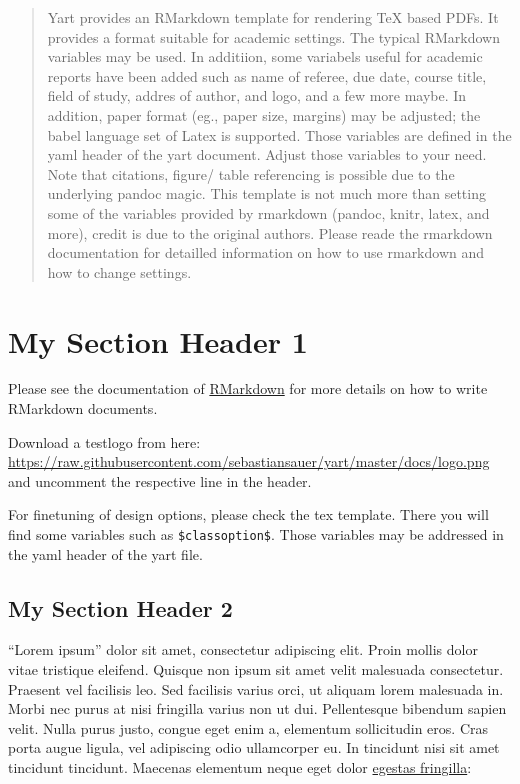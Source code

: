 \documentclass[11pt,ngerman,a4paper,oneside]{article}
\begin{document}
 \begin{abstract}
     Yart provides an RMarkdown template for rendering TeX based PDFs. It
     provides a format suitable for academic settings. The typical RMarkdown
     variables may be used. In additiion, some variabels useful for academic
     reports have been added such as name of referee, due date, course title,
     field of study, addres of author, and logo, and a few more maybe. In
     addition, paper format (eg., paper size, margins) may be adjusted; the
     babel language set of Latex is supported. Those variables are defined in
     the yaml header of the yart document. Adjust those variables to your
     need. Note that citations, figure/ table referencing is possible due to
     the underlying pandoc magic. This template is not much more than setting
     some of the variables provided by rmarkdown (pandoc, knitr, latex, and
     more), credit is due to the original authors. Please reade the rmarkdown
     documentation for detailled information on how to use rmarkdown and how
     to change settings.
 \end{abstract}
 \newpage




\newpage
\listoftables
\newpage
\listoffigures

{
\setcounter{tocdepth}{3}
\tableofcontents
}

\newpage
{}
\section{My Section Header 1}\label{my-section-header-1}

Please see the documentation of
\href{http://rmarkdown.rstudio.com/}{RMarkdown} for more details on how
to write RMarkdown documents.

Download a testlogo from here:
\url{https://raw.githubusercontent.com/sebastiansauer/yart/master/docs/logo.png}
and uncomment the respective line in the header.

For finetuning of design options, please check the tex template. There
you will find some variables such as \texttt{\$classoption\$}. Those
variables may be addressed in the yaml header of the yart file.

\subsection{My Section Header 2}\label{my-section-header-2}

\enquote{Lorem ipsum} dolor sit amet, consectetur adipiscing elit. Proin
mollis dolor vitae tristique eleifend. Quisque non ipsum sit amet velit
malesuada consectetur. Praesent vel facilisis leo. Sed facilisis varius
orci, ut aliquam lorem malesuada in. Morbi nec purus at nisi fringilla
varius non ut dui. Pellentesque bibendum sapien velit. Nulla purus
justo, congue eget enim a, elementum sollicitudin eros. Cras porta augue
ligula, vel adipiscing odio ullamcorper eu. In tincidunt nisi sit amet
tincidunt tincidunt. Maecenas elementum neque eget dolor
\href{http://example.com}{egestas fringilla}:
\end{document}
